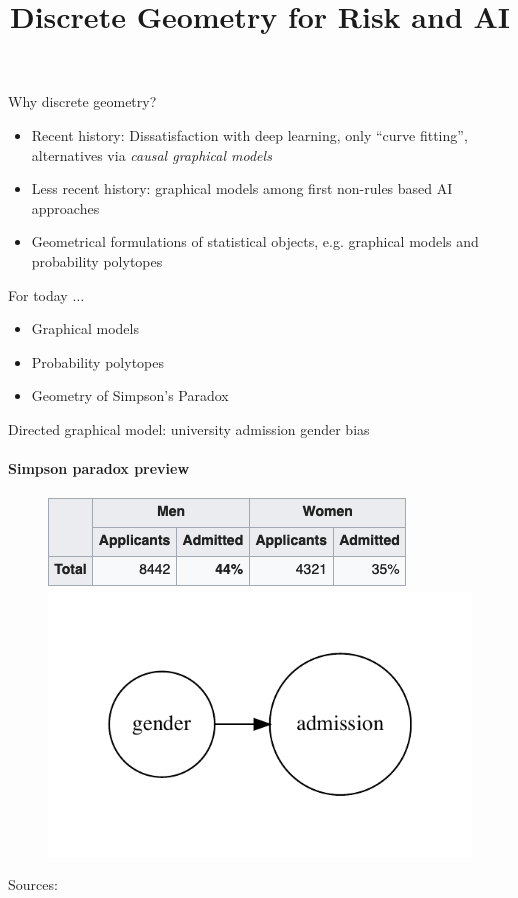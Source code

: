


\title{Discrete Geometry for Risk and AI}

\maketitle


\begin{frame}{Why discrete geometry?}
  \begin{itemize}
    \item Recent history: Dissatisfaction with deep learning, only ``curve fitting'', alternatives via \emph{causal graphical models} \cite{pearl2019limitations}
    \item Less recent history: graphical models among first non-rules based AI approaches \cite{darwiche2009modeling}
    \item Geometrical formulations of statistical objects, e.g. graphical models and probability polytopes\newline
  \end{itemize}
  For today $\ldots$
  \begin{itemize}
    \item Graphical models
    \item Probability polytopes
    \item Geometry of Simpson's Paradox
  \end{itemize}
\end{frame}


\begin{frame}{Directed graphical model: university admission gender bias}
  \framesubtitle{Simpson paradox preview}

  \begin{figure}[ht]
    \centering
            \includegraphics[height=0.15\textwidth]{graphics/berkeley}
            \includegraphics[height=0.4\textwidth]{graphics/admission_original}

    \end{figure}
    Sources: \cite{simpson-wikipedia} \cite{freedman1998statistics}
\end{frame}


